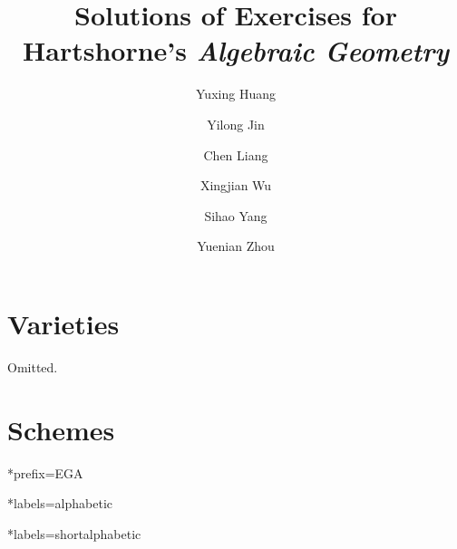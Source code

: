 \documentclass{amsart}
\title{Solutions of Exercises for Hartshorne's \emph{Algebraic Geometry}}
\date{}
\author{Yuxing Huang}
\author{Yilong Jin}
\author{Chen Liang}
\author{Xingjian Wu}
\author{Sihao Yang}
\author{Yuenian Zhou}
\theoremstyle{definition}
\theoremstyle{remark}\newtheorem{rmk}[theorem]{Remark}
\begin{document}
	\maketitle
	\tableofcontents
	\section{Varieties}
	Omitted.
	\section{Schemes}
	
	
	
	\begin{bibdiv}
		\begin{biblist}*{prefix={EGA}}
		\end{biblist}
		\begin{biblist}*{labels={alphabetic}}
		\end{biblist}
        \begin{biblist}*{labels={shortalphabetic}}
        \end{biblist}
	\end{bibdiv}
\end{document}
